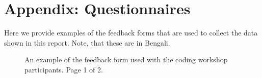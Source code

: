 \documentclass[12pt]{report} %
\begin{document}
\chapter{Appendix: Questionnaires}
Here we provide examples of the feedback forms that are used to collect the data shown in this report. Note, that these are in Bengali. 

\begin{figure}[t!]
    \centering
\caption{An example of the feedback form used with the coding workshop participants. Page 1 of 2. } 
\label{fig:QsP1}
\end{figure}
\end{document}
